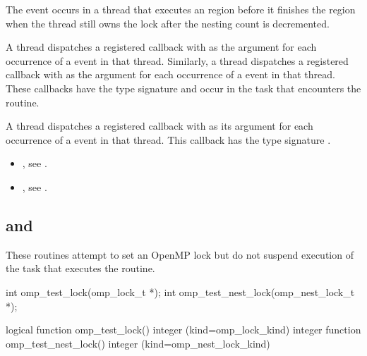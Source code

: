 The  event occurs in a thread that executes an 
 region before it finishes the region  when 
the thread still owns the lock after the nesting count is decremented.

\tools
A thread dispatches a registered 
callback with  as the  argument for 
each occurrence of a  event in that thread. Similarly,
a thread dispatches a registered 
callback with  as the  argument for 
each occurrence of a  event in that thread.
These callbacks have the type signature 
and occur in the task that encounters the routine.

A thread dispatches a registered 
callback with  as its  argument
for each occurrence of a  event in that thread. 
This callback has the type signature .

\crossreferences
\begin{itemize}
\item {}, see
.

\item {}, see
.
\end{itemize}



\subsection{ and }
\label{subsec:omp_test_lock and omp_test_nest_lock}
\summary
These routines attempt to set an OpenMP lock but do not suspend execution 
of the task that executes the routine.

\format
\begin{ccppspecific}
\begin{ompcFunction}
int omp_test_lock(omp_lock_t *);
int omp_test_nest_lock(omp_nest_lock_t *);
\end{ompcFunction}
\end{ccppspecific}

\begin{fortranspecific}
\begin{ompfFunction}
logical function omp_test_lock()
integer (kind=omp_lock_kind) 
integer function omp_test_nest_lock()
integer (kind=omp_nest_lock_kind) 
\end{ompfFunction}
\end{fortranspecific}

